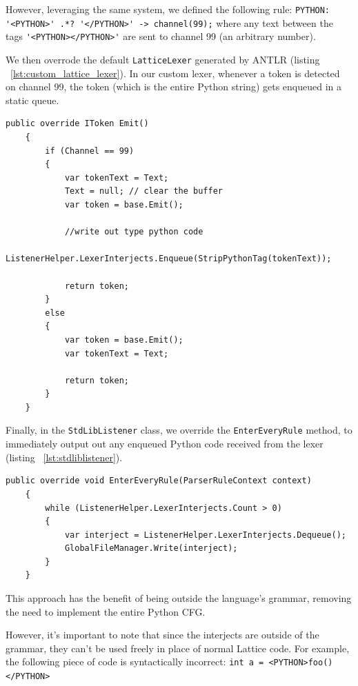 However, leveraging the same system, we defined the following rule: \lstinline{PYTHON: '<PYTHON>' .*? '</PYTHON>' -> channel(99);}
where any text between the tags \lstinline{'<PYTHON></PYTHON>'} are sent to channel 99 (an arbitrary number).

We then overrode the default \lstinline{LatticeLexer} generated by ANTLR (listing ~\ref{lst:custom_lattice_lexer}).
In our custom lexer, whenever a token is detected on channel 99, the token (which is the entire Python string)
gets enqueued in a static queue.

\begin{lstlisting}[caption={Excerpt from the class CustomLatticeLexer},captionpos=b, label={lst:custom_lattice_lexer}]
    public override IToken Emit()
    {
        if (Channel == 99)
        {
            var tokenText = Text;
            Text = null; // clear the buffer
            var token = base.Emit();

            //write out type python code
            ListenerHelper.LexerInterjects.Enqueue(StripPythonTag(tokenText));

            return token;
        }
        else
        {
            var token = base.Emit();
            var tokenText = Text;

            return token;
        }
    }
\end{lstlisting}
Finally, in the \lstinline{StdLibListener} class, we override the \lstinline{EnterEveryRule} method, to immediately
output out any enqueued Python code received from the lexer (listing ~\ref{lst:stdliblistener}).

\begin{lstlisting}[caption={Excerpt from the class StdLibListener},captionpos=b, label={lst:stdliblistener}]
    public override void EnterEveryRule(ParserRuleContext context)
    {
        while (ListenerHelper.LexerInterjects.Count > 0)
        {
            var interject = ListenerHelper.LexerInterjects.Dequeue();
            GlobalFileManager.Write(interject);
        }
    }
\end{lstlisting}

This approach has the benefit of being outside the language's grammar, removing the need to implement the entire Python
CFG.

However, it's important to note that since the interjects are outside of the grammar, they can't be used freely in place
of normal Lattice code.
For example, the following piece of code is syntactically incorrect: \lstinline{int a = <PYTHON>foo()</PYTHON>}

